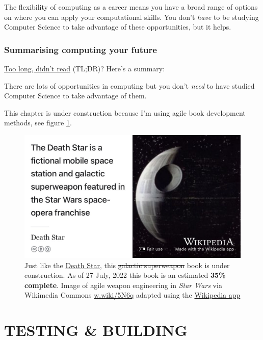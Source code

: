 \documentclass[
]{book}
\begin{document}
The flexibility of computing as a career means you have a broad range of options on where you can apply your computational skills. You don't \emph{have} to be studying Computer Science to take advantage of these opportunities, but it helps.

\hypertarget{tldr6}{%
\section{Summarising computing your future}\label{tldr6}}

\href{https://en.wiktionary.org/wiki/too_long;_didn\%27t_read}{Too long, didn't read} (TL;DR)? Here's a summary:

There are lots of opportunities in computing but you don't \emph{need} to have studied Computer Science to take advantage of them.

This chapter is under construction because I'm using agile book development methods, see figure \ref{fig:deathstar3-fig}.

\begin{figure}

{\centering \includegraphics[width=0.99\linewidth]{images/DeathStar2} 

}

\caption{Just like the \href{https://en.wikipedia.org/wiki/Death_Star}{Death Star}, this \sout{galactic superweapon} book is under construction. As of 27 July, 2022 this book is an estimated \textbf{35\% complete}. Image of agile weapon engineering in \emph{Star Wars} via Wikimedia Commons \href{https://w.wiki/5N6q}{w.wiki/5N6q} adapted using the \href{https://apps.apple.com/gb/app/wikipedia/id324715238}{Wikipedia app}}\label{fig:deathstar3-fig}
\end{figure}

\hypertarget{part-testing-building}{%
\part{TESTING \& BUILDING}\label{part-testing-building}}
\end{document}
